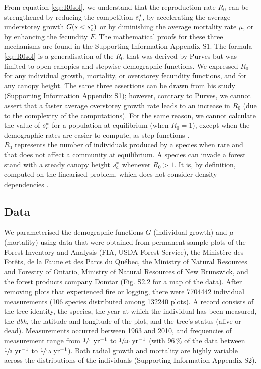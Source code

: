 From equation \eqref{eq::R0sol}, we understand that the reproduction rate $ R_0 $ can be strengthened by reducing the competition $ {s}^{*}_c $, by accelerating the average understorey growth $ G(s < {s}^{*}_c) $ or by diminishing the average mortality rate $ \mu $, or by enhancing the fecundity $ F $. The mathematical proofs for these three mechanisms are found in the Supporting Information Appendix S1. The formula \eqref{eq::R0sol} is a generalisation of the $ R_0 $ that was derived by Purves but was limited to open canopies and stepwise demographic functions. We expressed $ R_0 $ for any individual growth, mortality, or overstorey fecundity functions, and for any canopy height. The same three assertions can be drawn from his study (Supporting Information Appendix S1); however, contrary to Purves, we cannot assert that a faster average overstorey growth rate leads to an increase in $ R_0 $ (due to the complexity of the computations). For the same reason, we cannot calculate the value of $ {s}^{*}_c $ for a population at equilibrium (\ie when $ R_0 = 1 $), except when the demographic rates are easier to compute, as step functions \citep[Supporting Information Appendix S1 for the proof]{Purves2009}. \\

$ R_0 $ represents the number of individuals produced by a species when rare and that does not affect a community at equilibrium. A species can invade a forest stand with a steady canopy height $ {s}^{*}_c $ whenever $ R_0 > 1 $. It is, by definition, computed on the linearised problem, which does not consider density-dependencies \citep{Diekmann1990}.

\subsection{Data}
We parameterised the demographic functions $ G $ (individual growth) and $ \mu $ (mortality) using data that were obtained from permanent sample plots of the Forest Inventory and Analysis (FIA, USDA Forest Service), the Ministère des Forêts, de la Faune et des Parcs du Québec, the Ministry of Natural Resources and Forestry of Ontario, Ministry of Natural Resources of New Brunswick, and the forest products company Domtar (Fig. S2.2 for a map of the data). After removing plots that experienced fire or logging, there were \num{7704442} individual measurements (106 species distributed among \num{132240} plots). A record consists of the tree identity, the species, the year at which the individual has been measured, the \textit{\textit{dbh}}, the latitude and longitude of the plot, and the tree's status (alive or dead). Measurements occurred between 1963 and 2010, and frequencies of measurement range from $ \sfrac{1}{1} \text{ yr}^{-1} $ to $ \sfrac{1}{40} \text{ yr}^{-1} $ (with $ 96 \, \% $ of the data between $ \sfrac{1}{3} \text{ yr}^{-1} $ to $ \sfrac{1}{15} \text{ yr}^{-1} $). Both radial growth and mortality are highly variable across the distributions of the individuals (Supporting Information Appendix S2).

